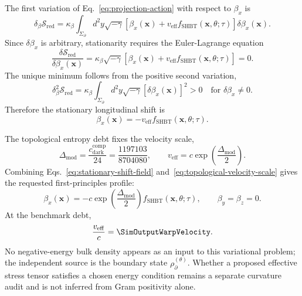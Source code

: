 The first variation of Eq.~\eqref{eq:projection-action} with respect to \(\beta_x\) is
\begin{equation}
  \delta_{\beta}\mathcal S_{\mathrm{red}}
  =
  \kappa_\beta
  \int_{\Sigma_\partial}
  d^2y\sqrt{-\gamma}
  \left[
    \beta_x(\boldsymbol{x})
    +
    v_{\mathrm{eff}}
    f_{\mathrm{SHBT}}(\boldsymbol{x},\theta;\tau)
  \right]
  \delta\beta_x(\boldsymbol{x}).
  \label{eq:first-variation-beta}
\end{equation}
Since \(\delta\beta_x\) is arbitrary, stationarity requires the Euler-Lagrange equation
\begin{equation}
  \frac{\delta\mathcal S_{\mathrm{red}}}
  {\delta\beta_x(\boldsymbol{x})}
  =
  \kappa_\beta\sqrt{-\gamma}
  \left[
    \beta_x(\boldsymbol{x})
    +
    v_{\mathrm{eff}}
    f_{\mathrm{SHBT}}(\boldsymbol{x},\theta;\tau)
  \right]
  =
  0.
  \label{eq:beta-euler-lagrange-equation}
\end{equation}
The unique minimum follows from the positive second variation,
\begin{equation}
  \delta_{\beta}^{2}\mathcal S_{\mathrm{red}}
  =
  \kappa_\beta
  \int_{\Sigma_\partial}
  d^2y\sqrt{-\gamma}
  \left[
    \delta\beta_x(\boldsymbol{x})
  \right]^2
  >0
  \quad
  \text{for }
  \delta\beta_x\neq0.
  \label{eq:positive-second-variation}
\end{equation}
Therefore the stationary longitudinal shift is
\begin{equation}
  \boxed{
  \beta_x(\boldsymbol{x})
  =
  -v_{\mathrm{eff}}
  f_{\mathrm{SHBT}}(\boldsymbol{x},\theta;\tau)
  }.
  \label{eq:stationary-shift-field}
\end{equation}

The topological entropy debt fixes the velocity scale,
\begin{equation}
  \Delta_{\mathrm{mod}}
  =
  \frac{c_{\mathrm{dark}}^{\mathrm{comp}}}{24}
  =
  \frac{1197103}{8704080},
  \qquad
  v_{\mathrm{eff}}
  =
  c
  \exp\left(
    \frac{\Delta_{\mathrm{mod}}}{2}
  \right).
  \label{eq:topological-velocity-scale}
\end{equation}
Combining Eqs.~\eqref{eq:stationary-shift-field} and~\eqref{eq:topological-velocity-scale} gives the requested first-principles profile:
\begin{equation}
  \boxed{
  \beta_x(\boldsymbol{x})
  =
  -c
  \exp\left(
    \frac{\Delta_{\mathrm{mod}}}{2}
  \right)
  f_{\mathrm{SHBT}}(\boldsymbol{x},\theta;\tau)
  },
  \qquad
  \beta_y=\beta_z=0.
  \label{eq:complete-shbt-shift-profile}
\end{equation}
At the benchmark debt,
\begin{equation}
  \frac{v_{\mathrm{eff}}}{c}
  =
  \SimOutputWarpVelocity.
  \label{eq:section3-benchmark-velocity}
\end{equation}
No negative-energy bulk density appears as an input to this variational problem; the independent source is the boundary state \(\rho_\partial^{(\theta)}\).  Whether a proposed effective stress tensor satisfies a chosen energy condition remains a separate curvature audit and is not inferred from Gram positivity alone.

